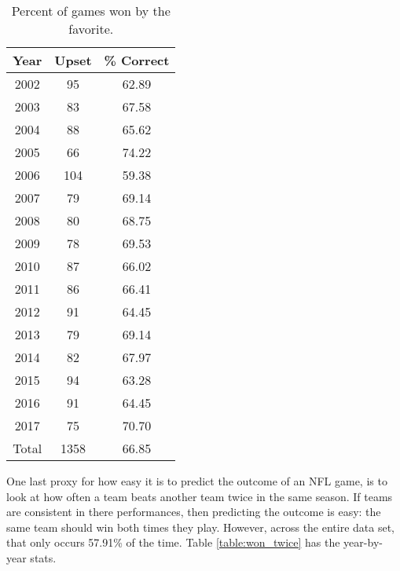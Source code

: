 \documentclass[11pt]{article}
\begin{document}
\begin{table}[!htb]
\begin{center}
\scriptsize
\begin{tabular}{|c|c|c|}
\hline
Year & Upset & \% Correct\\
\hline
2002 & 95 & 62.89\\
2003 & 83 & 67.58\\
2004 & 88 & 65.62\\
2005 & 66 & 74.22\\
2006 & 104 & 59.38\\
2007 & 79 & 69.14\\
2008 & 80 & 68.75\\
2009 & 78 & 69.53\\
2010 & 87 & 66.02\\
2011 & 86 & 66.41\\
2012 & 91 & 64.45\\
2013 & 79 & 69.14\\
2014 & 82 & 67.97\\
2015 & 94 & 63.28\\
2016 & 91 & 64.45\\
2017 & 75 & 70.70\\
\hline
Total & 1358 & 66.85\\
\hline
\end{tabular}
\caption{Percent of games won by the favorite.}\label{table:favorite_wins}
\end{center}
\end{table}

One last proxy for how easy it is to predict the outcome of an NFL game, is to look at how often a team beats another team twice in the same season. If teams are consistent in there performances, then predicting the outcome is easy: the same team should win both times they play. However, across the entire data set, that only occurs 57.91\% of the time. Table \ref{table:won_twice} has the year-by-year stats.
\end{document}
